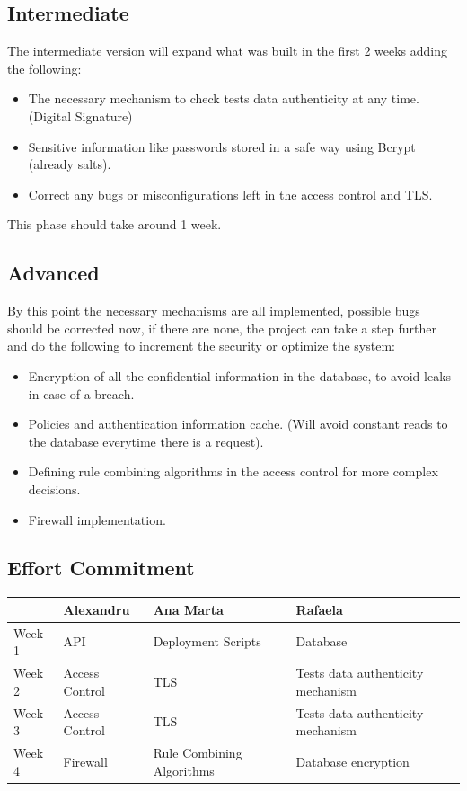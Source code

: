 \subsection{Intermediate}
The intermediate version will expand what was built in the first 2 weeks adding the following:
\begin{itemize}
	\item The necessary mechanism to check tests data authenticity at any time. (Digital Signature)
	\item Sensitive information like passwords stored in a safe way using Bcrypt (already salts).
	\item Correct any bugs or misconfigurations left in the access control and TLS.
\end{itemize}

This phase should take around 1 week.


\subsection{Advanced}

By this point the necessary mechanisms are all implemented, possible bugs should be corrected now, if there are none, the project can take a step further and do the following to increment the security or optimize the system:

\begin{itemize}
	\item Encryption of all the confidential information in the database, to avoid leaks in case of a breach.
	\item Policies and authentication information cache. (Will avoid constant reads to the database everytime there is a request).
	\item Defining rule combining algorithms in the access control for  more complex decisions.
	\item Firewall implementation.
\end{itemize}


\subsection{Effort Commitment}

\begin{tabularx}{0.8\textwidth} { 
  | >{\centering\arraybackslash}X 
  | >{\centering\arraybackslash}X 
  | >{\centering\arraybackslash}X 
  | >{\centering\arraybackslash}X | }
 \hline
  & Alexandru & Ana Marta & Rafaela \\
 \hline
 Week 1  & API & Deployment Scripts & Database \\
  \hline
  Week 2  & Access Control  & TLS & Tests data authenticity mechanism \\
   \hline
   Week 3  & Access Control  & TLS  & Tests data authenticity mechanism \\
    \hline
    Week 4  & Firewall  & Rule Combining Algorithms  & Database encryption \\
\hline
\end{tabularx}

